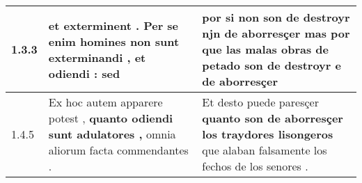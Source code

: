 \begin{tabular}{|p{1cm}|p{6.5cm}|p{6.5cm}|}

\hline
1.3.3 & et exterminent . Per se enim homines non sunt exterminandi , \textbf{ et odiendi : } sed & por si non son de destroyr \textbf{ njn de aborresçer } mas por que las malas obras de petado son de destroyr e de aborresçer \\\hline
1.4.5 & Ex hoc autem apparere potest , \textbf{ quanto odiendi sunt adulatores , } omnia aliorum facta commendantes . & Et desto puede paresçer \textbf{ quanto son de aborresçer los traydores lisongeros } que alaban falsamente los fechos de los senores . \\\hline

\end{tabular}
